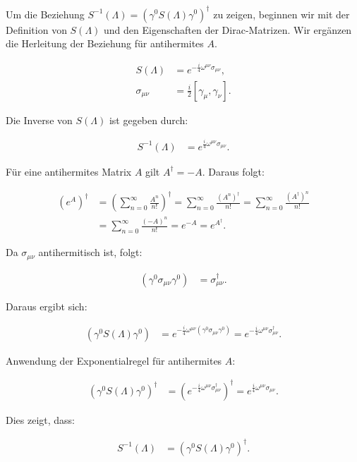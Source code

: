 Um die Beziehung \( S^{-1}(\Lambda) = \left(\gamma^0 S(\Lambda) \gamma^0\right)^{\dagger} \) zu zeigen, beginnen wir mit der Definition von \( S(\Lambda) \) und den Eigenschaften der Dirac-Matrizen. Wir ergänzen die Herleitung der Beziehung für antihermites \( A \).

\begin{align*}
S(\Lambda) &= e^{-\frac{i}{4} \omega^{\mu \nu} \sigma_{\mu \nu}}, \\
\sigma_{\mu \nu} &= \frac{i}{2} [\gamma_\mu, \gamma_\nu].
\end{align*}

Die Inverse von \( S(\Lambda) \) ist gegeben durch:

\begin{align*}
S^{-1}(\Lambda) &= e^{\frac{i}{4} \omega^{\mu \nu} \sigma_{\mu \nu}}.
\end{align*}

Für eine antihermites Matrix \( A \) gilt \( A^{\dagger} = -A \). Daraus folgt:

\begin{align*}
(e^A)^{\dagger} &= \left(\sum_{n=0}^{\infty} \frac{A^n}{n!}\right)^{\dagger} = \sum_{n=0}^{\infty} \frac{(A^n)^{\dagger}}{n!} = \sum_{n=0}^{\infty} \frac{(A^{\dagger})^n}{n!} \\
&= \sum_{n=0}^{\infty} \frac{(-A)^n}{n!} = e^{-A} = e^{A^{\dagger}}.
\end{align*}

Da \( \sigma_{\mu \nu} \) antihermitisch ist, folgt:

\begin{align*}
(\gamma^0 \sigma_{\mu \nu} \gamma^0) &= \sigma_{\mu \nu}^\dagger.
\end{align*}

Daraus ergibt sich:

\begin{align*}
\left(\gamma^0 S(\Lambda) \gamma^0\right) &= e^{-\frac{i}{4} \omega^{\mu \nu} (\gamma^0 \sigma_{\mu \nu} \gamma^0)} = e^{-\frac{i}{4} \omega^{\mu \nu} \sigma_{\mu \nu}^\dagger}.
\end{align*}

Anwendung der Exponentialregel für antihermites \( A \):

\begin{align*}
\left(\gamma^0 S(\Lambda) \gamma^0\right)^{\dagger} &= \left(e^{-\frac{i}{4} \omega^{\mu \nu} \sigma_{\mu \nu}^\dagger}\right)^{\dagger} = e^{\frac{i}{4} \omega^{\mu \nu} \sigma_{\mu \nu}}.
\end{align*}

Dies zeigt, dass:

\begin{align*}
S^{-1}(\Lambda) &= \left(\gamma^0 S(\Lambda) \gamma^0\right)^{\dagger}.
\end{align*}

